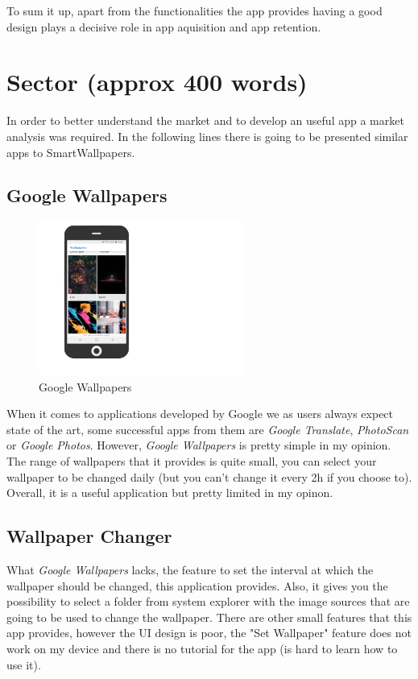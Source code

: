 \documentclass[]{article}
\begin{document}
	To sum it up, apart from the functionalities the app provides having a good design plays a decisive role in app aquisition and app retention.
\section{Sector (approx 400 words)}
	
	In order to better understand the market and to develop an useful app a market analysis was required. In the following lines there is going to be presented similar apps to SmartWallpapers.

\subsection{Google Wallpapers}
		
		\begin{figure}
	
			\centering
			\includegraphics[width=0.6\textwidth]{imgs/Google_Wallpapers.png}
			\caption{Google Wallpapers}

		\end{figure}

		When it comes to applications developed by Google we as users always expect state of the art, some successful apps from them are \textit{Google Translate}, \textit{PhotoScan} or \textit{Google Photos}. However, \textit{Google Wallpapers} is pretty simple in my opinion. The range of wallpapers that it provides is quite small, you can select your wallpaper to be changed daily (but you can't change it every 2h if you choose to). Overall, it is a useful application but pretty limited in my opinon.


		\subsection{Wallpaper Changer}
		What \textit{Google Wallpapers} lacks, the feature to set the interval at which the wallpaper should be changed, this application provides.
Also, it gives you the possibility to select a folder from system explorer with the image sources that are going to be used to change the wallpaper. There are other small features that this app provides, however the UI design is poor, the "Set Wallpaper"  feature does not work on my device and there is no tutorial for the app (is hard to learn how to use it).\\
\end{document}
